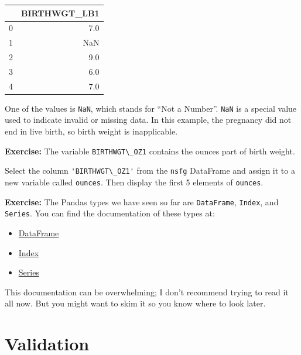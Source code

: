 \begin{tabular}{lr}
\toprule
{} &  BIRTHWGT\_LB1 \\
\midrule
0 &           7.0 \\
1 &           NaN \\
2 &           9.0 \\
3 &           6.0 \\
4 &           7.0 \\
\bottomrule
\end{tabular}

One of the values is \passthrough{\lstinline!NaN!}, which stands for
``Not a Number''. \passthrough{\lstinline!NaN!} is a special value used
to indicate invalid or missing data. In this example, the pregnancy did
not end in live birth, so birth weight is inapplicable.

\textbf{Exercise:} The variable \passthrough{\lstinline!BIRTHWGT\_OZ1!}
contains the ounces part of birth weight.

Select the column \passthrough{\lstinline!'BIRTHWGT\_OZ1'!} from the
\passthrough{\lstinline!nsfg!} DataFrame and assign it to a new variable
called \passthrough{\lstinline!ounces!}. Then display the first 5
elements of \passthrough{\lstinline!ounces!}.

\textbf{Exercise:} The Pandas types we have seen so far are
\passthrough{\lstinline!DataFrame!}, \passthrough{\lstinline!Index!},
and \passthrough{\lstinline!Series!}. You can find the documentation of
these types at:

\begin{itemize}
\item
  \href{https://pandas.pydata.org/pandas-docs/stable/reference/api/pandas.DataFrame.html}{DataFrame}
\item
  \href{https://pandas.pydata.org/pandas-docs/stable/reference/api/pandas.Index.html}{Index}
\item
  \href{https://pandas.pydata.org/pandas-docs/stable/reference/api/pandas.Series.html}{Series}
\end{itemize}

This documentation can be overwhelming; I don't recommend trying to read
it all now. But you might want to skim it so you know where to look
later.

\hypertarget{validation}{%
\section{Validation}\label{validation}}

